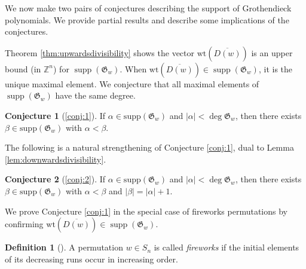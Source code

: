 \documentclass{amsart}
\theoremstyle{definition}
\newtheorem{definition}[theorem]{Definition}
\theoremstyle{named}
\newtheorem*{namedconjecture}{Conjecture}
\newcommand{\avecom}[1]{\textcolor{red}{[$\star$A: #1\ $\star$]}}
\DeclareMathOperator{\supp}{supp}
\begin{document}
	
	We now make two pairs of conjectures describing the support of Grothendieck polynomials. We provide partial results and describe some implications of the conjectures.
	 
	Theorem \ref{thm:upwardsdivisibility} shows the vector $\mathrm{wt}(\overline{D(w)})$
	is an upper bound (in $\mathbb{Z}^n$) for $\supp(\mathfrak{G}_w)$.
	When $\mathrm{wt}(\overline{D(w)})\in \supp(\mathfrak{G}_w)$, it is the unique maximal element. 
	We conjecture that all maximal elements of $\supp(\mathfrak{G}_w)$ have the same degree. 
		
	\begin{namedconjecture}[\ref{conj:1}]
		If $\alpha\in \mathrm{supp}(\mathfrak{G}_w)$ and $|\alpha|<\deg \mathfrak{G}_w$, then there exists $\beta\in\mathrm{supp}(\mathfrak{G}_w)$ with $\alpha< \beta$.
	\end{namedconjecture}
	The following is a natural strengthening of Conjecture \ref{conj:1}, dual to Lemma \ref{lem:downwardsdivisibility}.
	\begin{namedconjecture}[\ref{conj:2}]
		If $\alpha\in \mathrm{supp}(\mathfrak{G}_w)$ and $|\alpha|<\deg \mathfrak{G}_w$, then there exists $\beta\in\mathrm{supp}(\mathfrak{G}_w)$ with $\alpha< \beta$ and $|\beta|=|\alpha|+1$.
	\end{namedconjecture}
	We prove Conjecture \ref{conj:1} in the special case of fireworks permutations by confirming $\mathrm{wt}(\overline{D(w)})\in \supp(\mathfrak{G}_w)$.
	
	\begin{definition}[{\cite[Definition 3.5]{PSW}}]
		A permutation $w \in S_n$ is called \emph{fireworks} if the initial elements of its decreasing runs occur in increasing order.
	\end{definition}
	
\end{document}
